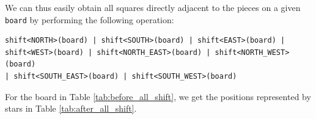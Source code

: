 \documentclass[12pt,a4paper,twoside,openright]{book}
\begin{document}
We can thus easily obtain all squares directly adjacent to the pieces on a given \texttt{board} by performing the following operation:

\begin{verbatim}
shift<NORTH>(board) | shift<SOUTH>(board) | shift<EAST>(board) | 
shift<WEST>(board) | shift<NORTH_EAST>(board) | shift<NORTH_WEST>(board) 
| shift<SOUTH_EAST>(board) | shift<SOUTH_WEST>(board)
\end{verbatim}

For the board in Table \ref{tab:before_all_shift}, we get the positions represented by stars in Table \ref{tab:after_all_shift}.\\
\end{document}
